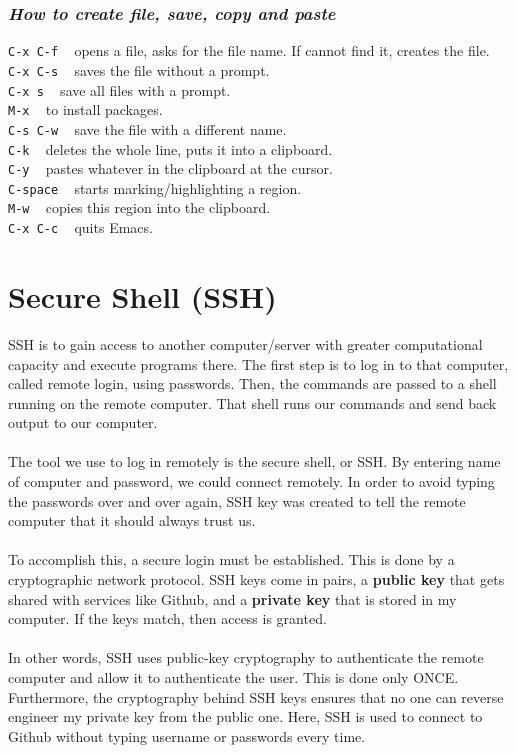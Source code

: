 \documentclass{article}
\begin{document}
{{{\subsubsection{\small\textsl{How to create file, save, copy and paste}}
\texttt{C-x C-f} ~ opens a file, asks for the file name. If cannot find it, creates the file.\\
\texttt{C-x C-s} ~ saves the file without a prompt.\\
\texttt{C-x s} ~ save all files with a prompt.\\
\texttt{M-x} ~ to install packages. \\
\texttt{C-s C-w} ~ save the file with a different name.\\
\texttt{C-k} ~ deletes the whole line, puts it into a clipboard.\\
\texttt{C-y} ~ pastes whatever in the clipboard at the cursor.\\
\texttt{C-space} ~ starts marking/highlighting a region.\\
\texttt{M-w} ~ copies this region into the clipboard.\\
\texttt{C-x C-c} ~ quits Emacs.\\

\newpage
\section{Secure Shell (SSH)}

SSH is to gain access to another computer/server with greater computational capacity and execute programs there. The first step is to log in to that computer, called remote login, using passwords. Then, the commands are passed to a shell running on the remote computer. That shell runs our commands and send back output to our computer. \\
\\
The tool we use to log in remotely is the secure shell, or SSH. By entering name of computer and password, we could connect remotely. In order to avoid typing the passwords over and over again, SSH key was created to tell the remote computer that it should always trust us. \\
\\
To accomplish this, a secure login must be established. This is done by a cryptographic network protocol. SSH keys come in pairs, a \textbf{public key} that gets shared with services like Github, and a \textbf{private key} that is stored in my computer. If the keys match, then access is granted. \\
\\
In other words, SSH uses public-key cryptography to authenticate  the remote computer and allow it to authenticate the user. This is done only ONCE. Furthermore, the cryptography behind SSH keys ensures that no one can reverse engineer my private key from the public one. Here, SSH is used to connect to Github without typing username or passwords every time.\\


}}}
\end{document}
